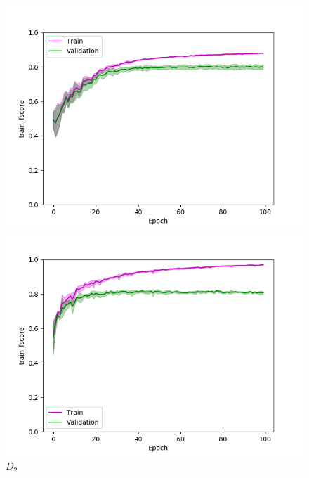 \def\year{2017}\relax \documentclass[letterpaper]{article}
\begin{document}
\begin{figure}
\centering
\begin{minipage}{.24\textwidth}
  \centering
\includegraphics[width=\textwidth]{pics/d1_train_fscore_mean_train_test.png}
\caption{$D_1$}\label{fig:d1fscoretraintest}
\end{minipage}
\begin{minipage}{.01\textwidth}
\end{minipage}
\begin{minipage}{.24\textwidth}
  \centering
\includegraphics[width=\textwidth]{pics/d2_train_fscore_mean_train_test.png}
\caption{$D_2$}\label{fig:d2fscoretraintest}
\end{minipage}
\begin{minipage}{.24\textwidth}

\end{minipage}
\end{figure}
\end{document}

